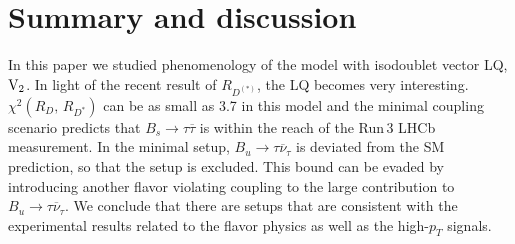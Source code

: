\documentclass[12pt, a4paper]{article}
\numberwithin{equation}{section} %
\newcommand{\ov}{\overline}
\newcommand{\1}{\mbox{1}\hspace{-0.25em}\mbox{l}}
\begin{document}
\begin{table}[t]
\begin{center}
  \caption{Summary table for the non-LHC bound on the coupling product assuming $m_{\rm{V}_2}=2\,$TeV.
}
  \label{Tab:ModelNRC_summary}
\end{center}   
\vspace{-.45cm}
\end{table}


\section{Summary and discussion}
\label{sec:Summary}
In this paper we studied phenomenology of the model with isodoublet vector LQ, $\rm{V}_2$.
In light of the recent result of $R_{D^{(*)}}$, the LQ becomes very interesting.
$\chi^2(R_D,\,R_{D^*})$ can be as small as 3.7 in this model and the minimal coupling scenario predicts that $B_s\to\tau\ov\tau$ is within the reach of the Run\,3 LHCb measurement. 
In the minimal setup, $B_u\to\tau\ov\nu_\tau$ is deviated from the SM prediction, so that the setup is excluded.
This bound can be evaded by introducing another flavor violating coupling to the large contribution to $B_u\to\tau\ov\nu_\tau$.
We conclude that there are setups that are consistent with the experimental results related to the flavor physics as well as the high-$p_T$ signals.
\end{document}
